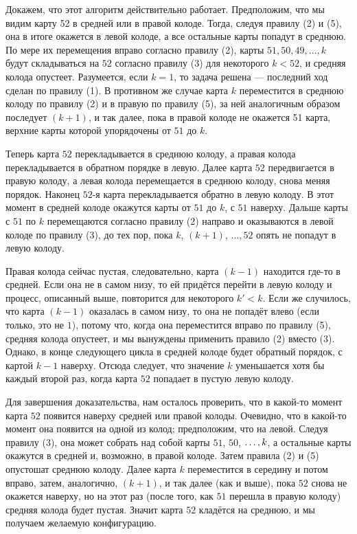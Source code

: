 Докажем, что этот алгоритм действительно работает.
Предположим, что мы видим карту 52 в средней или в правой колоде.
Тогда, следуя правилу (2) и (5), она в итоге окажется в левой колоде, а все остальные карты попадут в среднюю.
По мере их перемещения вправо согласно правилу (2), карты $51, 50, 49, \dots, k$ будут складываться на $52$ согласно правилу (3) для некоторого $k < 52$, и средняя колода опустеет.
Разумеется, если $k = 1$, то задача решена --- последний ход сделан по правилу (1).
В противном же случае карта $k$ переместится в среднюю колоду по правилу (2) и в правую по правилу (5), за ней аналогичным образом последует $(k+1)$, и так далее, пока в правой колоде не окажется 51 карта, верхние карты которой упорядочены от $51$ до $k$.

Теперь карта $52$ перекладывается в среднюю колоду,
а правая колода перекладывается в обратном порядке в левую.
Далее карта $52$ передвигается в правую колоду, а левая колода перемещается в среднюю колоду, снова меняя порядок.
Наконец $52$-я карта перекладывается обратно в левую колоду.
В этот момент в средней колоде окажутся карты от $51$ до $k$, с $51$ наверху.
Дальше карты с $51$ по $k$ перемещаются согласно правилу (2) направо и оказываются в левой колоде по правилу (3), до тех пор, пока $k$, $(k+1)$, $\dots, 52$ опять не попадут в левую колоду.

Правая колода сейчас пустая, следовательно,  карта $(k-1)$ находится где-то в средней.
Если она не в самом низу, то ей придётся перейти в левую колоду и процесс, описанный выше, повторится для некоторого $k'<k$.
Если же случилось, что карта $(k-1)$ оказалась в самом низу, то она не попадёт влево (если только, это не $1$), потому что, когда она переместится вправо по правилу (5), средняя колода опустеет, и мы вынуждены применить правило (2) вместо (3).
Однако, в конце следующего цикла в средней колоде будет обратный порядок, с картой $k-1$ наверху.
Отсюда следует, что значение $k$ уменьшается хотя бы каждый второй раз, когда карта $52$ попадает в пустую левую колоду.

Для завершения доказательства, нам осталось проверить, что в какой-то момент карта $52$ появится наверху средней или правой колоды.
Очевидно, что в какой-то момент она появится на одной из колод;
предположим, что на левой.
Следуя правилу (3), она может собрать над собой карты $51$, $50$, $\z\dots, k$, а остальные карты окажутся в средней и, возможно, в правой колоде.
Затем правила (2) и (5) опустошат среднюю колоду.
Далее карта $k$ переместится в середину и потом вправо, затем, аналогично, $(k+1)$, и так далее (как и выше), пока $52$ снова не окажется наверху, но на этот раз (после того, как $51$ перешла в правую колоду) средняя колода будет пустая.
Значит карта $52$ кладётся на среднюю, и мы получаем желаемую конфигурацию.

